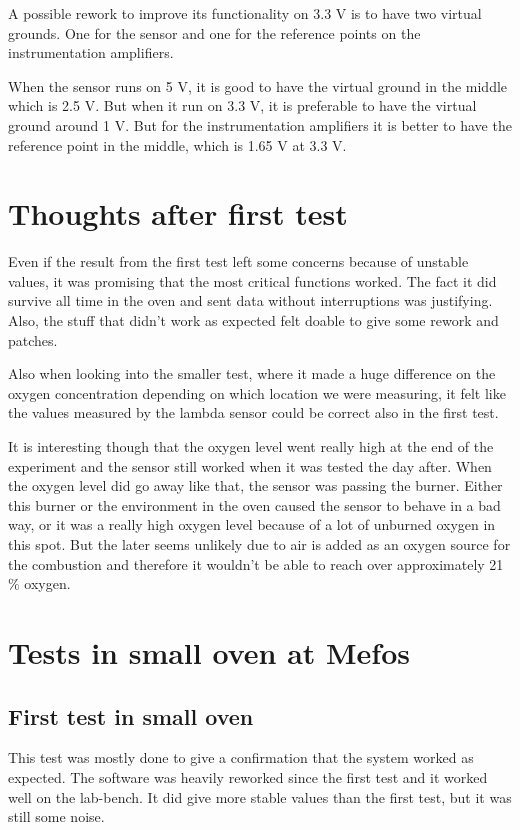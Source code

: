 A possible rework to improve its functionality on 3.3 V is to have two virtual grounds. One for the sensor and one for the reference points on the instrumentation amplifiers.

When the sensor runs on 5 V, it is good to have the virtual ground in the middle which is 2.5 V. But when it run on 3.3 V, it is preferable to have the virtual ground around 1 V. But for the instrumentation amplifiers it is better to have the reference point in the middle, which is 1.65 V at 3.3 V.



\section{Thoughts after first test}

Even if the result from the first test left some concerns because of unstable values, it was promising that the most critical functions worked. The fact it did survive all time in the oven and sent data without interruptions was justifying. Also, the stuff that didn't work as expected felt doable to give some rework and patches.

Also when looking into the smaller test, where it made a huge difference on the oxygen concentration depending on which location we were measuring, it felt like the values measured by the lambda sensor could be correct also in the first test. 

It is interesting though that the oxygen level went really high at the end of the experiment and the sensor still worked when it was tested the day after. When the oxygen level did go away like that, the sensor was passing the burner. Either this burner or the environment in the oven caused the sensor to behave in a bad way, or it was a really high oxygen level because of a lot of unburned oxygen in this spot. But the later seems unlikely due to air is added as an oxygen source for the combustion and therefore it wouldn't be able to reach over approximately 21 $\%$ oxygen.

\section{Tests in small oven at Mefos}

\subsection{First test in small oven}

This test was mostly done to give a confirmation that the system worked as expected. The software was heavily reworked since the first test and it worked well on the lab-bench. It did give more stable values than the first test, but it was still some noise.

